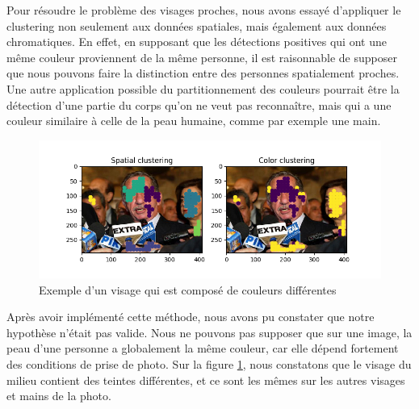 \documentclass[a4paper,11pt]{article}
\begin{document}
Pour résoudre le problème des visages proches, nous avons essayé d'appliquer le clustering non seulement aux données spatiales, mais également aux données chromatiques.
En effet, en supposant que les détections positives qui ont une même couleur proviennent de la même personne, il est raisonnable de supposer que nous pouvons faire la distinction entre des personnes spatialement proches.
Une autre application possible du partitionnement des couleurs pourrait être la détection d'une partie du corps qu'on ne veut pas reconnaître, mais qui a une couleur similaire à celle de la peau humaine, comme par exemple une main.
\newline
\begin{figure}[H]
\begin{center}
    \includegraphics[scale=0.5]{color_clustering_different_people.png}
    \caption{Exemple d'un visage qui est composé de couleurs différentes} 
    \label{fig:color_clustering_different_people}
\end{center}
\end{figure}
Après avoir implémenté cette méthode, nous avons pu constater que notre hypothèse n'était pas valide.
Nous ne pouvons pas supposer que sur une image, la peau d'une personne a globalement la même couleur, car elle dépend fortement des conditions de prise de photo.
Sur la figure \ref{fig:color_clustering_different_people}, nous constatons que le visage du milieu contient des teintes différentes, et ce sont les mêmes sur les autres visages et mains de la photo.
\end{document}
